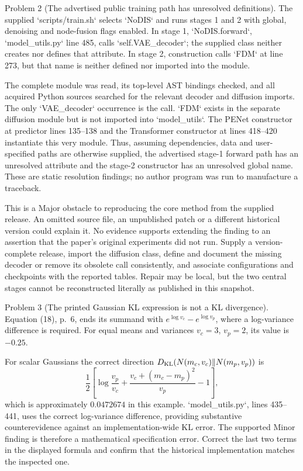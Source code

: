 \documentclass[10pt]{article}
\begin{document}
Problem 2 (The advertised public training path has unresolved definitions).  The supplied `scripts/train.sh` selects `NoDIS` and runs stages 1 and 2 with global, denoising and node-fusion flags enabled. In stage 1, `NoDIS.forward`, `model\_utils.py` line 485, calls `self.VAE\_decoder`; the supplied class neither creates nor defines that attribute. In stage 2, construction calls `FDM` at line 273, but that name is neither defined nor imported into the module.\par
The complete module was read, its top-level AST bindings checked, and all acquired Python sources searched for the relevant decoder and diffusion imports. The only `VAE\_decoder` occurrence is the call. `FDM` exists in the separate diffusion module but is not imported into `model\_utils`. The PENet constructor at predictor lines 135–138 and the Transformer constructor at lines 418–420 instantiate this very module. Thus, assuming dependencies, data and user-specified paths are otherwise supplied, the advertised stage-1 forward path has an unresolved attribute and the stage-2 constructor has an unresolved global name. These are static resolution findings; no author program was run to manufacture a traceback.\par
This is a Major obstacle to reproducing the core method from the supplied release. An omitted source file, an unpublished patch or a different historical version could explain it. No evidence supports extending the finding to an assertion that the paper’s original experiments did not run. Supply a version-complete release, import the diffusion class, define and document the missing decoder or remove its obsolete call consistently, and associate configurations and checkpoints with the reported tables. Repair may be local, but the two central stages cannot be reconstructed literally as published in this snapshot.\par
Problem 3 (The printed Gaussian KL expression is not a KL divergence).  Equation (18), p. 6, ends its summand with \(e^{\log v_c}-e^{\log v_p}\), where a log-variance difference is required. For equal means and variances \(v_c=3\), \(v_p=2\), its value is \(-0.25\).\par
For scalar Gaussians the correct direction \(D_{\rm KL}(N(m_c,v_c)\|N(m_p,v_p))\) is \[\frac12\left[\log\frac{v_p}{v_c}+\frac{v_c+(m_c-m_p)^2}{v_p}-1\right],\] which is approximately \(0.0472674\) in this example. `model\_utils.py`, lines 435–441, uses the correct log-variance difference, providing substantive counterevidence against an implementation-wide KL error. The supported Minor finding is therefore a mathematical specification error. Correct the last two terms in the displayed formula and confirm that the historical implementation matches the inspected one.\par
\end{document}
